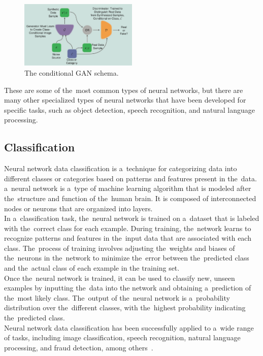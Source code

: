     \begin{center}
        \begin{figure}[!ht]
            \centering
            \includegraphics[width=0.5\textwidth]{figures/gan}
            \caption{The conditional GAN schema. \cite{creswell2018generative}}
            \label{fig:gan}
        \end{figure}
    \end{center}

These are some of the~most common types of neural networks, but there are many other specialized types of neural
networks that have been developed for specific tasks, such as object detection, speech recognition, and
natural language processing.\\

\subsection{Classification} \label{subsec:clasification}
Neural network data classification is a~technique for categorizing data into different classes or categories based on
patterns and features present in the~data. a~neural network is a~type of machine learning algorithm that is modeled
after the~structure and function of the~human brain. It is composed of interconnected nodes or neurons that are
organized into layers.\\
In a~classification task, the~neural network is trained on a~dataset that is labeled with the~correct
class for each example. During training, the~network learns to recognize patterns and features in the~input data
that are associated with each class. The~process of training involves adjusting the~weights and biases of the~neurons
in the~network to minimize the~error between the~predicted class and the~actual class of each example in the
training set.\\
Once the~neural network is trained, it can be used to classify new, unseen examples by inputting the~data into
the network and obtaining a~prediction of the~most likely class. The~output of the~neural network is a~probability
distribution over the~different classes, with the~highest probability indicating the~predicted class.\\
Neural network data classification has been successfully applied to a~wide range of tasks, including image
classification, speech recognition, natural language processing, and fraud detection, among others~\cite{feraud2002methodology}.

